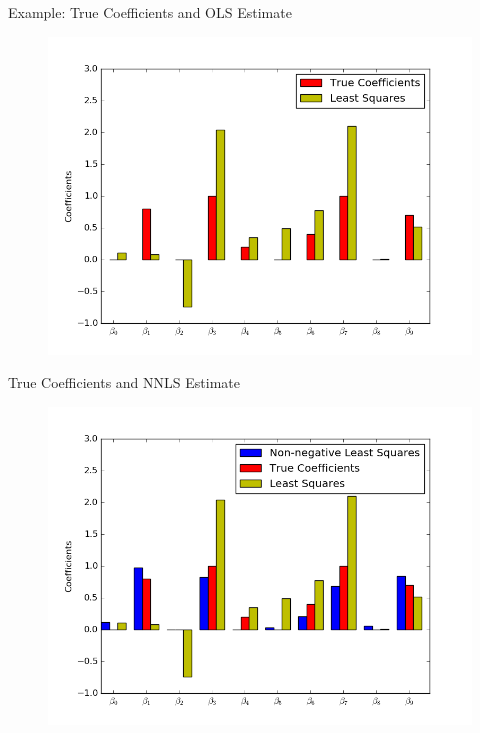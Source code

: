 \documentclass{beamer}
\begin{document}
\begin{frame}{Example: True Coefficients and OLS Estimate}
	\vfill
	\begin{figure}
		\includegraphics[width=1\textwidth]{figs/nnls1.png}
	\end{figure}
	\vfill
\end{frame}

\begin{frame}{True Coefficients and NNLS Estimate}
	\vfill
	\begin{figure}
		\includegraphics[width=1\textwidth]{figs/nnls2.png}
	\end{figure}
	\vfill
\end{frame}
\end{document}
